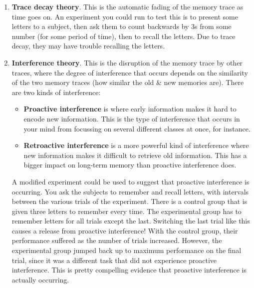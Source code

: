 \documentclass[]{article}
\begin{document}
				\begin{enumerate}
					\item \textbf{Trace decay theory}. This is the automatic fading of the memory trace as time goes on. An experiment you could run to test this is to present some letters to a subject, then ask them to count backwards by 3s from some number (for some period of time), then to recall the letters. Due to trace decay, they may have trouble recalling the letters.
					\item \textbf{Interference theory}. This is the disruption of the memory trace by other traces, where the degree of interference that occurs depends on the similarity of the two memory traces (how similar the old \& new memories are). There are two kinds of interference:
						\begin{itemize}
							\item \textbf{Proactive interference} is where early information makes it hard to encode new information. This is the type of interference that occurs in your mind from focussing on several different classes at once, for instance.
							\item \textbf{Retroactive interference} is a more powerful kind of interference where new information makes it difficult to retrieve old information. This has a bigger impact on long-term memory than proactive interference does.
						\end{itemize}

						A modified experiment could be used to suggest that proactive interference is occurring. You ask the subjects to remember and recall letters, with intervals between the various trials of the experiment. There is a control group that is given three letters to remember every time. The experimental group has to remember letters for all trials except the last. Switching the last trial like this causes a release from proactive interference! With the control group, their performance suffered as the number of trials increased. However, the experimental group jumped back up to maximum performance on the final trial, since it was a different task that did not experience proactive interference. This is pretty compelling evidence that proactive interference is actually occurring.
				\end{enumerate}
\end{document}
